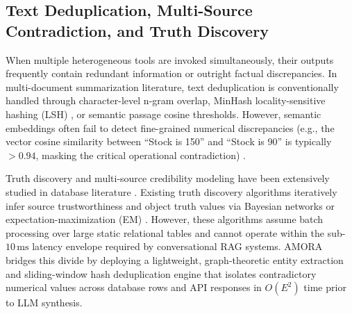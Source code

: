 \documentclass[fleqn,10pt]{article}
\begin{document}
\subsection{Text Deduplication, Multi-Source Contradiction, and Truth Discovery}
When multiple heterogeneous tools are invoked simultaneously, their outputs frequently contain redundant information or outright factual discrepancies. In multi-document summarization literature, text deduplication is conventionally handled through character-level n-gram overlap, MinHash locality-sensitive hashing (LSH) \cite{broder1997minhash}, or semantic passage cosine thresholds. However, semantic embeddings often fail to detect fine-grained numerical discrepancies (e.g., the vector cosine similarity between ``Stock is 150'' and ``Stock is 90'' is typically $>0.94$, masking the critical operational contradiction) \cite{min2023factscore}.

Truth discovery and multi-source credibility modeling have been extensively studied in database literature \cite{li2014resolving,zheng2017truth}. Existing truth discovery algorithms iteratively infer source trustworthiness and object truth values via Bayesian networks or expectation-maximization (EM) \cite{dawid1979maximum}. However, these algorithms assume batch processing over large static relational tables and cannot operate within the sub-$10\,\text{ms}$ latency envelope required by conversational RAG systems. AMORA bridges this divide by deploying a lightweight, graph-theoretic entity extraction and sliding-window hash deduplication engine that isolates contradictory numerical values across database rows and API responses in $O(E^2)$ time prior to LLM synthesis.
\end{document}

